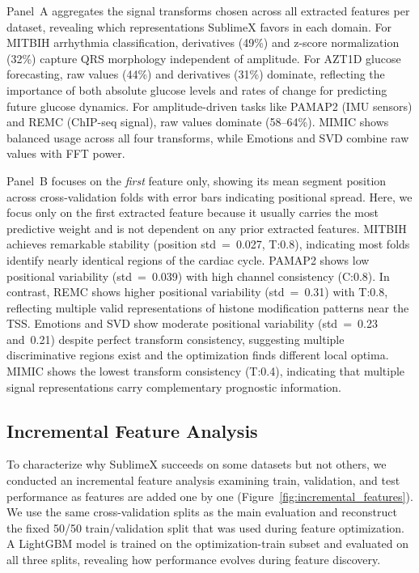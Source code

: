 \documentclass[times, review, 10pt]{elsarticle}
\begin{document}
Panel~A aggregates the signal transforms chosen across all extracted features per dataset, revealing which representations SublimeX favors in each domain.
For MITBIH arrhythmia classification, derivatives (49\%) and z-score normalization (32\%) capture QRS morphology independent of amplitude. For AZT1D glucose forecasting, 
raw values (44\%) and derivatives (31\%) dominate, reflecting the importance of both absolute glucose levels and rates of change for predicting future glucose dynamics. 
For amplitude-driven tasks like PAMAP2 (IMU sensors) and REMC (ChIP-seq signal), raw values dominate (58--64\%). MIMIC shows balanced usage across all four transforms, 
while Emotions and SVD combine raw values with FFT power.

Panel~B focuses on the \emph{first} feature only, showing its mean segment position across cross-validation folds with error bars indicating positional spread.
Here, we focus only on the first extracted feature because it usually carries the most predictive weight and is not dependent on any prior extracted features.
MITBIH achieves remarkable stability (position std~=~0.027, T:0.8), indicating most folds identify nearly identical regions of the cardiac cycle. PAMAP2 shows low
positional variability (std~=~0.039) with high channel consistency (C:0.8). In contrast, REMC shows higher positional variability (std~=~0.31) with T:0.8,
reflecting multiple valid representations of histone modification patterns near the TSS. Emotions and SVD show moderate positional variability (std~=~0.23 and~0.21) despite perfect transform consistency, 
suggesting multiple discriminative regions exist and the optimization finds different local optima.
MIMIC shows the lowest transform consistency (T:0.4), indicating that multiple signal representations carry complementary prognostic information.

\subsection{Incremental Feature Analysis}
\label{sec:feature_analysis}

To characterize why SublimeX succeeds on some datasets but not
others, we conducted an incremental feature analysis examining
train, validation, and test performance as features are added one
by one (Figure~\ref{fig:incremental_features}). We use the same
cross-validation splits as the main evaluation and reconstruct the
fixed 50/50 train/validation split that was used during feature
optimization. A LightGBM model is trained on the optimization-train
subset and evaluated on all three splits, revealing how performance
evolves during feature discovery.
\end{document}
